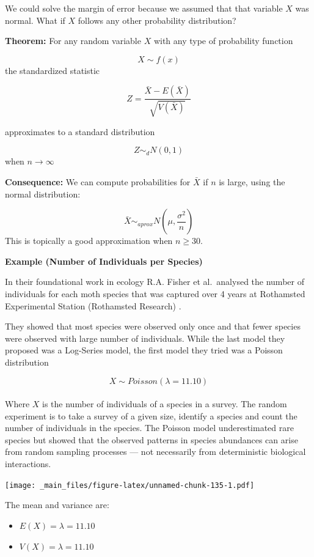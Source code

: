 \documentclass[
]{book}
\providecommand{\tightlist}{%
  \setlength{\itemsep}{0pt}\setlength{\parskip}{0pt}}
\begin{document}
We could solve the margin of error because we assumed that that variable \(X\) was normal. What if \(X\) follows any other probability distribution?

\textbf{Theorem:} For any random variable \(X\) with any type of probability function

\[X \sim f(x)\]
the standardized statistic

\[Z=\frac{\bar{X}-E(\bar{X})}{\sqrt{V(\bar{X})}}\]

approximates to a standard distribution

\[Z \sim_d N(0,1)\] when \(n\rightarrow \infty\)

\textbf{Consequence:} We can compute probabilities for \(\bar{X}\) if \(n\) is large, using the normal distribution:

\[\bar{X} \sim_{aprox}  N(\mu, \frac{\sigma^2}{n})\]
This is topically a good approximation when \(n\geq 30\).

\textbf{Example (Number of Individuals per Species)}

In their foundational work in ecology R.A. Fisher et al.~analysed the number of individuals for each moth species that was captured over 4 years at Rothamsted Experimental Station (Rothamsted Research) \citep{fisher1943species}.

They showed that most species were observed only once and that fewer species were observed with large number of individuals. While the last model they proposed was a Log-Series model, the first model they tried was a Poisson distribution

\[X \sim Poisson(\lambda=11.10)\]\\
Where \(X\) is the number of individuals of a species in a survey. The random experiment is to take a survey of a given size, identify a species and count the number of individuals in the species. The Poisson model underestimated rare species but showed that the observed patterns in species abundances can arise from random sampling processes --- not necessarily from deterministic biological interactions.

\texttt{[image: \_main\_files/figure-latex/unnamed-chunk-135-1.pdf]}

The mean and variance are:

\begin{itemize}
\tightlist
\item
  \(E(X)=\lambda=11.10\)
\item
  \(V(X)=\lambda=11.10\)
\end{itemize}
\end{document}
